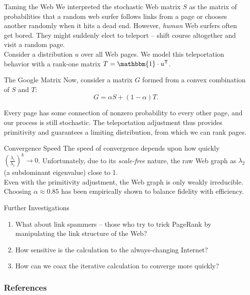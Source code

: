 \documentclass{beamer}
\newcommand{\transpose}[1]{#1^{\mathsf{T}}}
\newcommand{\parens}[1]{ \left( #1 \right) }
\begin{document}
\begin{frame}{Taming the Web}
    We interpreted the stochastic Web matrix $S$ as the matrix of probabilities that a random web surfer follows links from a page or chooses another randomly when it hits a dead end. However, \textit{human} Web surfers often get bored. They might suddenly elect to teleport -- shift course altogether and visit a random page.\\
    \vspace{2mm}
    \pause Consider a distribution $u$ over all Web pages. We model this teleportation behavior with a rank-one matrix $T = \mathbbm{1} \cdot \transpose{u}$.
\end{frame}

\begin{frame}{The Google Matrix}
    Now, consider a matrix $G$ formed from a convex combination of $S$ and $T$:
	\begin{equation*}
	    \label{google_matrix}
		G = \alpha S + (1-\alpha)T.
	\end{equation*}
	
	\pause Every page has some connection of nonzero probability to every other page, and our process is still stochastic. The teleportation adjustment thus provides primitivity and guarantees a limiting distribution, from which we can rank pages.
\end{frame}

\begin{frame}{Convergence Speed}
    The speed of convergence depends upon how quickly $\parens{\frac{\lambda_i}{\lambda_1}}^k \to 0$. Unfortunately, due to its \textit{scale-free} nature, the raw Web graph as $\lambda_2$ (a subdominant eigenvalue) close to 1. \\
    \vspace{2mm}
    \pause Even with the primitivity adjustment, the Web graph is only weakly irreducible. \\
    \vspace{2mm}
    \pause Choosing $\alpha \approx 0.85$ has been empirically shown to balance fidelity with efficiency.
\end{frame}

\begin{frame}{Further Investigations}
    \begin{enumerate}
        \item What about link spammers -- those who try to trick PageRank by manipulating the link structure of the Web?
        \item How sensitive is the calculation to the always-changing Internet?
        \item How can we coax the iterative calculation to converge more quickly? 
    \end{enumerate}
\end{frame}

\begin{frame}[allowframebreaks]
        \frametitle{References}
        
        
\end{frame}
\end{document}
